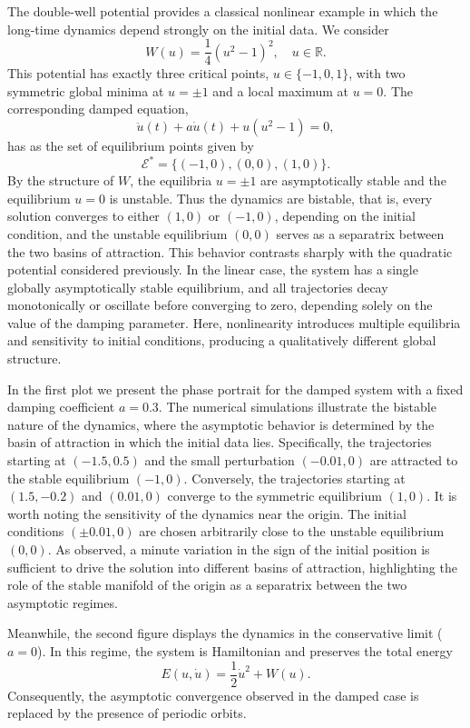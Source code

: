 \documentclass[12pt]{amsart}
\numberwithin{equation}{section}
\begin{document}
The double-well potential provides a classical nonlinear example in which the long-time dynamics depend strongly on the initial data. We consider
$$
W(u)=\frac14(u^{2}-1)^{2}, \quad u\in\mathbb{R}.
$$
This potential has exactly three critical points, $u\in\{-1,0,1\}$, with two symmetric global minima at $u=\pm 1$ and a local maximum at $u=0$. The corresponding damped equation,
$$
\ddot{u}(t)+a\dot{u}(t)+u(u^{2}-1)=0,
$$
has as the set of equilibrium points given by 
$$
\mathcal{E}^{\ast}=\{(-1,0),(0,0),(1,0)\}.
$$
By the structure of $W$, the equilibria $u=\pm 1$ are asymptotically stable and the equilibrium $u=0$ is unstable. Thus the dynamics are bistable, that is, every solution converges to either $(1,0)$ or $(-1,0)$, depending on the initial condition, and the unstable equilibrium $(0,0)$ serves as a separatrix between the two basins of attraction. This behavior contrasts sharply with the quadratic potential considered previously. In the linear case, the system has a single globally asymptotically stable equilibrium, and all trajectories decay monotonically or oscillate before converging to zero, depending solely on the value of the damping parameter. Here, nonlinearity introduces multiple equilibria and sensitivity to initial conditions, producing a qualitatively different global structure.
	
In the first plot we present the phase portrait for the damped system with a fixed damping coefficient $a = 0.3$. The numerical simulations illustrate the bistable nature of the dynamics, where the asymptotic behavior is determined by the basin of attraction in which the initial data lies. 
Specifically, the trajectories starting at $(-1.5, 0.5)$ and the small perturbation $(-0.01, 0)$ are attracted to the stable equilibrium $(-1, 0)$. Conversely, the trajectories starting at $(1.5, -0.2)$ and $(0.01, 0)$ converge to the symmetric equilibrium $(1, 0)$. 
It is worth noting the sensitivity of the dynamics near the origin. The initial conditions $(\pm 0.01, 0)$ are chosen arbitrarily close to the unstable equilibrium $(0, 0)$. As observed, a minute variation in the sign of the initial position is sufficient to drive the solution into different basins of attraction, highlighting the role of the stable manifold of the origin as a separatrix between the two asymptotic regimes.
	
Meanwhile, the second figure displays the dynamics in the conservative limit ($a = 0$). 
In this regime, the system is Hamiltonian and preserves the total energy 
\[
E(u, \dot{u}) = \frac{1}{2}\dot{u}^2 + W(u). 
\]
Consequently, the asymptotic convergence observed in the damped case is replaced by 
the presence of periodic orbits. 
\end{document}
